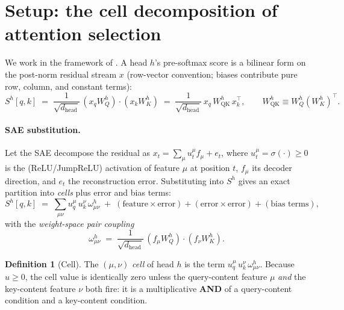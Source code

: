\documentclass[11pt]{article}
\newcommand{\dhead}{d_{\mathrm{head}}}
\newcommand{\QK}{\mathrm{QK}}
\theoremstyle{definition}
\newtheorem{definition}{Definition}
\theoremstyle{plain}
\theoremstyle{remark}
\begin{document}
\section{Setup: the cell decomposition of attention selection}\label{sec:setup}

We work in the framework of \citet{elhage2021mathematical}. A head $h$'s pre-softmax score is a bilinear form on the post-norm residual stream $x$ (row-vector convention; biases contribute pure row, column, and constant terms):
\begin{equation}
  S^h[q,k] \;=\; \frac{1}{\sqrt{\dhead}}\,(x_q W_Q^h)\cdot(x_k W_K^h)
  \;=\; \frac{1}{\sqrt{\dhead}}\, x_q\, W_{\QK}^h\, x_k^{\top},
  \qquad W_{\QK}^h \equiv W_Q^h (W_K^h)^{\top}.
\end{equation}

\paragraph{SAE substitution.} Let the SAE decompose the residual as $x_t = \sum_\mu u^\mu_t f_\mu + e_t$, where $u^\mu_t = \sigma(\cdot)\ge 0$ is the (ReLU/JumpReLU) activation of feature $\mu$ at position $t$, $f_\mu$ its decoder direction, and $e_t$ the reconstruction error. Substituting into $S^h$ gives an exact partition into \emph{cells} plus error and bias terms:
\begin{equation}\label{eq:cells}
  S^h[q,k] \;=\; \sum_{\mu\nu} u^\mu_q\, u^\nu_k\, \omega^h_{\mu\nu}
  \;+\; (\text{feature}\times\text{error}) + (\text{error}\times\text{error}) + (\text{bias terms}),
\end{equation}
with the \emph{weight-space pair coupling}
\begin{equation}
  \omega^h_{\mu\nu} \;=\; \frac{1}{\sqrt{\dhead}}\,(f_\mu W_Q^h)\cdot(f_\nu W_K^h).
\end{equation}

\begin{definition}[Cell]\label{def:cell}
The $(\mu,\nu)$ \emph{cell} of head $h$ is the term $u^\mu_q\, u^\nu_k\, \omega^h_{\mu\nu}$. Because $u\ge 0$, the cell value is identically zero unless the query-content feature $\mu$ \emph{and} the key-content feature $\nu$ both fire: it is a multiplicative \textbf{AND} of a query-content condition and a key-content condition.
\end{definition}
\end{document}
